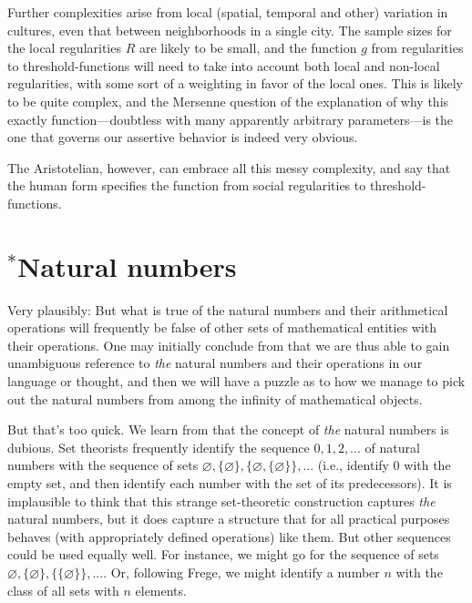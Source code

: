Further complexities arise from local (spatial, temporal and other) variation in cultures, even that between neighborhoods 
in a single city. The 
sample sizes for the local regularities $R$ are likely to be small, and the function $g$ from regularities to 
threshold-functions will need to take into account both local and non-local regularities, with some sort of a weighting 
in favor of the local ones. This is likely to be quite complex, and the Mersenne question of the explanation of 
why this exactly function---doubtless with many apparently arbitrary parameters---is the one that governs our 
assertive behavior is indeed very obvious. 

The Aristotelian, however, can embrace all this messy complexity, and say that the human form specifies the function from social 
regularities to threshold-functions. 

\section{$^*$Natural numbers}
Very plausibly:
But what is true of the natural numbers and their arithmetical operations will frequently be false of other sets of mathematical
entities with their operations. One may initially conclude from  that we are thus able to gain unambiguous
reference to \textit{the} natural numbers and their operations in our language or thought, and then we will have a puzzle as 
to how we manage to pick out the natural numbers from among the infinity of mathematical objects.

But that's too quick. We learn from  that the concept of \textit{the} natural numbers is dubious. Set theorists
frequently identify the sequence $0,1,2,...$ of natural numbers with the sequence of sets $\varnothing, \{\varnothing\},
\{\varnothing, \{\varnothing\}\},...$ (i.e., identify $0$ with the empty set, and then identify each number with the 
set of its predecessors). It is implausible to think that this strange set-theoretic construction captures 
\textit{the} natural numbers, but it does capture a structure that for all practical purposes behaves (with appropriately
defined operations) like them. But other sequences could be used equally well. For instance, we might 
go for the sequence of sets $\varnothing, \{\varnothing\}, \{\{\varnothing\}\},...$. Or, following Frege, we might 
identify a number $n$ with the class of all sets with $n$ elements. 

